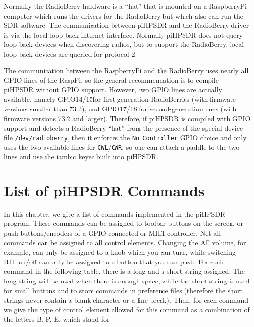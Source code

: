 \documentclass[12pt]{book}
\def\pH{pi\-HPSDR\xspace}
\begin{document}
Normally the RadioBerry hardware is a ``hat'' that is mounted on a RaspberryPi computer which runs
the drivers for the RadioBerry but which also can run the SDR software. The communication between
 \pH and the RadioBerry driver is via the local loop-back internet
interface. Normally \pH does not query loop-back devices when discovering radios, but to support
the RadioBerry, local loop-back devices are queried for protocol-2.

The communication between the RaspberryPi and the RadioBerry uses nearly all GPIO lines of the
RaspPi, so the general recommendation is to compile \pH without GPIO support. However, two GPIO lines
are actually available, namely GPIO14/15for first-generation RadioBerries
 (with firmware versions smaller than 73.2),
and GPIO17/18 for second-generation ones (with firmware versions 73.2 and larger).
Therefore, if \pH is compiled with GPIO support and detects a RadioBerry ``hat''
from the presence of the special device file  \texttt{/dev/radioberry},
then it enforces
the \texttt{No Controller} GPIO choice and only uses the two available lines for
\texttt{CWL}/\texttt{CWR}, so one can attach a paddle to the two lines and use the iambic
keyer built into \pH.


\appendix
\chapter{List of \pH Commands}
\label{sec:commandlist}

In this chapter, we give a list of commands implemented in the \pH program. These commands can be
assigned to toolbar buttons on the screen, or push-buttons/encoders of a GPIO-connected or MIDI controller.
Not all commands can be assigned to all control elements. Changing the AF volume, for example, can only be
assigned to a knob
which you can turn, while switching RIT on/off can only be assigned to a button that you can push. For each
command in the following table, there is a long and a short string assigned. The long string will be used
when there is enough space, while the short string is used for small buttons and to store commands in
preference files (therefore the short strings never contain a blank character or a line break). Then, for
each command we give the type of control element allowed for this command as a combination of the letters B,
P, E, which stand for
\end{document}
